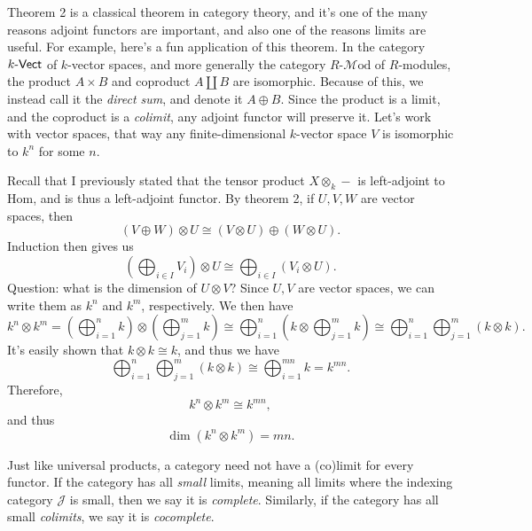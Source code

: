 Theorem 2 is a classical theorem in category theory, and it's one of the many reasons adjoint functors are important, and also one of the reasons limits are useful. For example, here's a fun application of this theorem. In the category $k\text{-}\mathsf{Vect} $ of $k$-vector spaces, and more generally the category $R$-$\mathcal{M} \mathrm{od} $ of $R$-modules, the product $A\times B$ and coproduct $A\amalg B$ are isomorphic. Because of this, we instead call it the \emph{direct sum}, and denote it $A\oplus B$. Since the product is a limit, and the coproduct is a \emph{colimit}, any adjoint functor will preserve it. Let's work with vector spaces, that way any finite-dimensional $k$-vector space $V$ is isomorphic to $k^n$ for some $n$.

Recall that I previously stated that the tensor product $X\otimes_k-$ is left-adjoint to Hom, and is thus a left-adjoint functor. By theorem 2, if $U,V,W$ are vector spaces, then
\[
	\left( V\oplus W \right) \otimes U\cong \left( V\otimes U \right) \oplus \left( W\otimes U \right) 
.\]
Induction then gives us
\[
	\left(\bigoplus_{i\in I} V_i\right)\otimes U\cong \bigoplus_{i\in I} \left( V_i\otimes U \right) 
.\]
Question: what is the dimension of $U\otimes V$? Since $U,V$ are vector spaces, we can write them as $k^{n} $ and $k^{m}$, respectively. We then have
\[
	k^{n} \otimes k^{m} =\left( \bigoplus_{i=1}^n k \right) \otimes \left( \bigoplus_{j=1}^m k \right) \cong \bigoplus_{i=1}^n \left( k\otimes \bigoplus_{j=1}^m k \right) \cong \bigoplus_{i=1}^n \bigoplus_{j=1}^m \left( k\otimes k \right) 
.\]
It's easily shown that $k\otimes k\cong k$, and thus we have
\[
	\bigoplus_{i=1}^n \bigoplus_{j=1}^m \left( k\otimes k \right)\cong \bigoplus_{i=1}^{mn} k=k^{mn} 
.\]
Therefore,
\[
	k^{n} \otimes k^{m} \cong k^{mn} ,
\]
and thus
\[
	\dim \left( k^{n}  \otimes k^{m}\right) =mn
.\]

\begin{remark}
	Just like universal products, a category need not have a (co)limit for every functor. If the category has all \emph{small} limits, meaning all limits where the indexing category $\mathcal{J} $ is small, then we say it is \emph{complete}. Similarly, if the category has all small \emph{colimits}, we say it is \emph{cocomplete}.
\end{remark}

